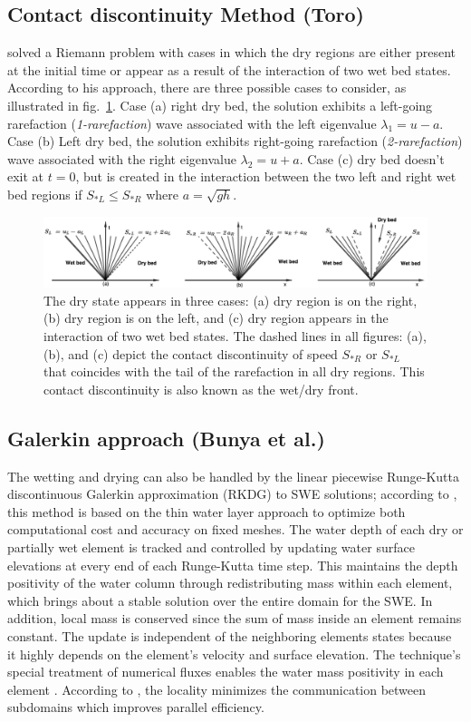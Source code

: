 \documentclass[10pt,a4paper]{article}
\begin{document}
	\subsection{Contact discontinuity  Method (Toro)}
	\citet{toro2001shock} solved a Riemann problem with cases in which the dry regions are either present at the initial time or appear as a result of the interaction of two wet bed states. According to his approach, there are three possible cases to consider, as illustrated in fig.~\ref{fig:dry-wet}. Case (a) right dry bed, the solution exhibits a left-going rarefaction ({\em 1-rarefaction}) wave associated with the left eigenvalue $\lambda_1 = u - a$. Case (b) Left dry bed, the solution exhibits right-going rarefaction ({\em 2-rarefaction}) wave associated with the right eigenvalue $\lambda_2 = u + a$. Case (c) dry bed doesn't exit at $t=0$, but is created in the interaction between the two left and right wet bed regions if $S_{*L} \le S_{*R}$ where $a = \sqrt{gh}$.
		\begin{figure}[H]
		\centering
		\includegraphics[width=.9\linewidth]{images/dry-wet}
		\caption{The dry state appears in three cases: (a) dry region is on the right, (b) dry region is on the left, and (c) dry region appears in the interaction of two wet bed states. The dashed lines in all figures: (a), (b), and (c) depict the contact discontinuity of speed $S_{*R}$ or $S_{*L}$ that coincides with the tail of the rarefaction in all dry regions. This contact discontinuity is also known as the wet/dry front.}
		\label{fig:dry-wet}
	\end{figure}
	


	\subsection{Galerkin approach (Bunya et al.)}  
		The wetting and drying can also be handled by the linear piecewise  Runge-Kutta discontinuous Galerkin approximation (RKDG)  to SWE solutions;  according to \citet{bu-ku-we-da:2009}, this method is based on the thin water layer approach to optimize both computational cost and accuracy on fixed meshes. The water depth of each dry or partially wet element is tracked and controlled by updating water surface elevations at every end of each Runge-Kutta time step. This maintains the depth positivity of the water column through redistributing mass within each element, which brings about a stable solution over the entire domain for the SWE. In addition, local mass is conserved since the sum of mass inside an element remains constant. The update is independent of the neighboring elements states because it highly depends on the element's velocity and surface elevation. The technique's special treatment of numerical fluxes enables the water mass positivity in each element \cite{bu-ku-we-da:2009,kubatko2007semi}. According to \citet{bokhove2005flooding,bu-ku-we-da:2009}, the locality minimizes the communication between subdomains which improves parallel efficiency. 
\end{document}
